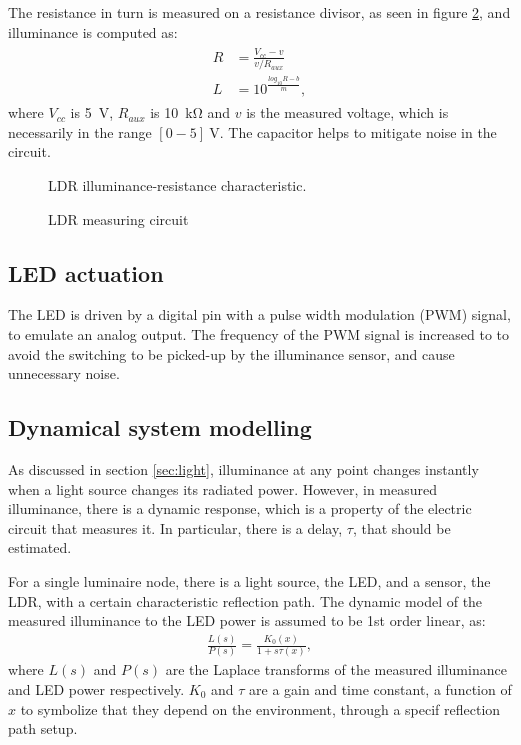 \documentclass[english,fira]{ist-report}
\begin{document}
The resistance in turn is measured on a resistance divisor, as seen in figure \ref{fig:ldr-circuit}, and illuminance is computed as:
\begin{align}
\begin{aligned}
    R &= \frac{V_{cc} - v}{v/R_{aux}}\\
    L &= 10^{\frac{log_{10}R-b}{m}}, 
\end{aligned}
\label{eq:L-calc}
\end{align}
where $V_{cc}$ is \SI{5}{\volt}, $R_{aux}$ is \SI{10}{\kilo\ohm} and $v$ is the measured voltage, which is necessarily in the range $[0-5]\SI{}{\volt}$. The capacitor helps to mitigate noise in the circuit.

\begin{figure}[ht]
    \centering
    \caption{LDR illuminance-resistance characteristic.}
    \label{fig:ldr-characteristic}
\end{figure}
\begin{figure}[ht]
    \centering
    
    \caption{LDR measuring circuit}
    \label{fig:ldr-circuit}
\end{figure}


\subsection{LED actuation}

The LED is driven by a digital pin with a pulse width modulation (PWM) signal, to emulate an analog output.
The frequency of the PWM signal is increased to  to avoid the switching to be picked-up by the illuminance sensor, and cause unnecessary noise.

\subsection{Dynamical system modelling}

As discussed in section \ref{sec:light}, illuminance at any point changes instantly when a light source changes its radiated power.
However, in measured illuminance, there is a dynamic response, which is a property of the electric circuit that measures it. 
In particular, there is a delay, $\tau$, that should be estimated.

For a single luminaire node, there is a light source, the LED, and a sensor, the LDR, with a certain characteristic reflection path. The dynamic model of the measured illuminance to the LED power is assumed to be 1st order linear, as:
\begin{align}
    \frac{L(s)}{P(s)} = \frac{K_0(x)}{1+s\tau(x)},
\end{align}
where $L(s)$ and $P(s)$ are the Laplace transforms of the measured illuminance and LED power respectively. $K_0$ and $\tau$ are a gain and time constant, a function of $x$ to symbolize that they depend on the environment, through a specif reflection path setup.
\end{document}
